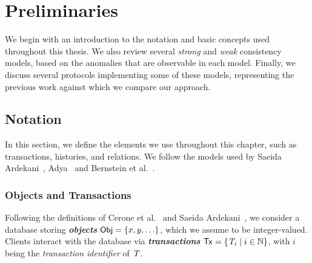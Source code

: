 \cleardoublepage
\chapter{Preliminaries}
\label{chapter:preliminaries}



We begin with an introduction to the notation and basic concepts used throughout this thesis. We also review several \emph{strong} and \emph{weak} consistency models, based on the anomalies that are observable in each model. Finally, we discuss several protocols implementing some of these models, representing the previous work against which we compare our approach.

\section{Notation}
\label{sect:notation}

In this section, we define the elements we use throughout this chapter, such as transactions, histories, and relations. We follow the models used by Saeida Ardekani~\citep{ardekani_thesis}, Adya~\citep{adya_thesis} and Bernstein et al.~\citep{bernstein_concurrency}.

\subsection{Objects and Transactions}
\label{sect:obj_tx}

Following the definitions of Cerone et al.~\citep{concur_framework} and Saeida Ardekani~\citep{ardekani_thesis}, we consider a database storing \textbf{\em objects} ${\sf Obj} = \{x, y, \ldots\}$, which we assume to be integer-valued. Clients interact with the database via \textbf{\em transactions} ${\sf Tx} = \{\mathit{T}_i \mid i \in \mathbb{N}\}$, with $i$ being the \emph{transaction identifier} of $\mathit{T}$.



